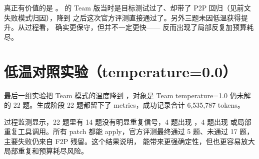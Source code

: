 \documentclass[UTF8,a4paper,11pt]{ctexart}
\begin{document}
真正有价值的是 。 的 Team 版当时是目标测试过了、却带了 P2P 回归（见前文失败模式归因），降到  之后这次官方评测直接通过了。另外三题未因低温获得提升。从过程看， 确实更保守，但并不一定更快—— 反而出现了局部反复加预算耗尽。

\section{低温对照实验（temperature=0.0）}

最后一组实验把 Team 模式的温度降到 ，对象是 Team temperature=1.0 仍未解的 22 题。生成阶段 22 题都留下了 metrics，成功记录合计 6,535,787 tokens。

过程监测显示，22 题里有 14 题没有明显重复信号，4 题出现 ，4 题出现  或局部重复工具调用。所有 patch 都能 apply，官方评测最终通过 5 题、未通过 17 题，主要失败仍来自 F2P 残留。这个结果说明， 能带来更强确定性，但也更容易放大局部重复和预算耗尽风险。
\end{document}
